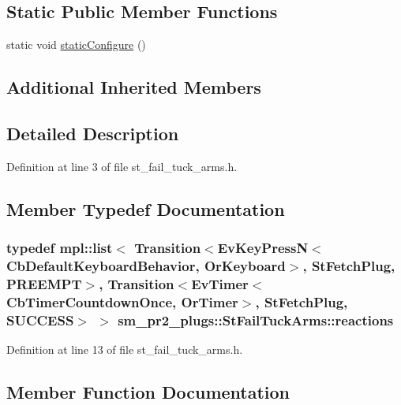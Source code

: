 \subsection*{Static Public Member Functions}
\begin{DoxyCompactItemize}
\item 
static void \hyperlink{structsm__pr2__plugs_1_1StFailTuckArms_ac23b79659008da8001dfe46ce7e0e8b7}{static\+Configure} ()
\end{DoxyCompactItemize}
\subsection*{Additional Inherited Members}


\subsection{Detailed Description}


Definition at line 3 of file st\+\_\+fail\+\_\+tuck\+\_\+arms.\+h.



\subsection{Member Typedef Documentation}
\subsubsection[{\texorpdfstring{reactions}{reactions}}]{\setlength{\rightskip}{0pt plus 5cm}typedef mpl\+::list$<$ Transition$<$Ev\+Key\+PressN$<$Cb\+Default\+Keyboard\+Behavior, {\bf Or\+Keyboard}$>$, {\bf St\+Fetch\+Plug}, {\bf P\+R\+E\+E\+M\+PT}$>$, Transition$<$Ev\+Timer$<$Cb\+Timer\+Countdown\+Once, {\bf Or\+Timer}$>$, {\bf St\+Fetch\+Plug}, {\bf S\+U\+C\+C\+E\+SS}$>$ $>$ {\bf sm\+\_\+pr2\+\_\+plugs\+::\+St\+Fail\+Tuck\+Arms\+::reactions}}\hypertarget{structsm__pr2__plugs_1_1StFailTuckArms_a722dbc85911ba3976f94bbc08eb06eac}{}\label{structsm__pr2__plugs_1_1StFailTuckArms_a722dbc85911ba3976f94bbc08eb06eac}


Definition at line 13 of file st\+\_\+fail\+\_\+tuck\+\_\+arms.\+h.



\subsection{Member Function Documentation}
